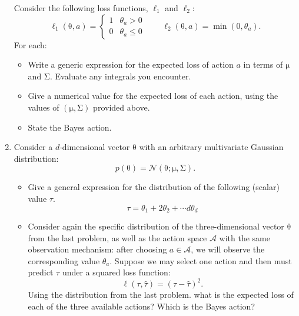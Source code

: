 \documentclass{article}
\newcommand{\mc}[1]{\mathcal{#1}}
\newcommand{\mat}[1]{\bm{\mathrm{#1}}}
\renewcommand{\vec}[1]{\bm{\mathrm{#1}}}
\begin{document}
\begin{enumerate}
  Consider the following loss functions, $\ell_1$ and $\ell_2$:
  \begin{equation*}
    \ell_1(\vec{\theta}, a) =
    \begin{cases}
      1 & \theta_a   >  0 \\
      0 & \theta_a \leq 0
    \end{cases}
    \qquad
    \ell_2(\vec{\theta}, a) = \min(0, \theta_a).
  \end{equation*}
  For each:
  \begin{itemize}
  \item
    Write a generic expression for the expected loss of action $a$ in
    terms of $\vec{\mu}$ and $\mat{\Sigma}$.  Evaluate any integrals
    you encounter.
  \item
    Give a numerical value for the expected loss of each action, using
    the values of $(\vec{\mu}, \mat{\Sigma})$ provided above.
  \item
    State the Bayes action.
  \end{itemize}

\item
  Consider a $d$-dimensional vector $\vec{\theta}$ with an arbitrary
  multivariate Gaussian distribution:
  \begin{equation*}
    p(\vec{\theta})
    =
    \mc{N}(\vec{\theta}; \vec{\mu}, \mat{\Sigma}).
  \end{equation*}
  \begin{itemize}
  \item
    Give a general expression for the distribution of the following
    (scalar) value $\tau$.
    \begin{equation*}
      \tau = \theta_1 + 2\theta_2 + \dotsb d\theta_d
    \end{equation*}
  \item
    Consider again the specific distribution of the three-dimensional
    vector $\vec{\theta}$ from the last problem, as well as the action
    space $\mc{A}$ with the same observation mechanism: after choosing
    $a \in \mc{A}$, we will observe the corresponding value
    $\theta_a$.  Suppose we may select one action and then must
    predict $\tau$ under a squared loss function:
    \begin{equation*}
      \ell(\tau, \hat{\tau}) = (\tau - \hat{\tau})^2.
    \end{equation*}
    Using the distribution from the last problem. what is the expected
    loss of each of the three available actions?  Which is the Bayes
    action?
  \end{itemize}


\end{enumerate}
\end{document}
